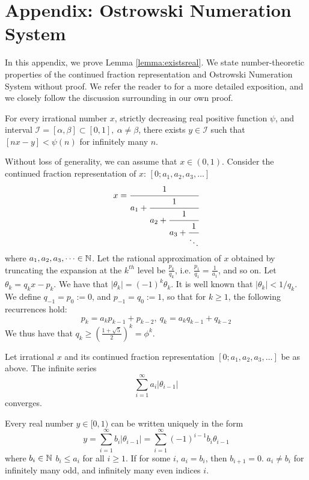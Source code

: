 \section{Appendix: Ostrowski Numeration System}
\label{appendix:ostrowski}

In this appendix, we prove Lemma \ref{lemma:existsreal}. We state number-theoretic properties of the continued fraction representation and Ostrowski Numeration System without proof. We refer the reader to \cite{bourla2016ostrowski} for a more detailed exposition, and we closely follow the discussion surrounding \cite[Propositions 1.1, 2.1]{berthe2022dynamics} in our own proof. 

\begin{lemma}
\label{lemma:existsreal2}
For every irrational number $x$, strictly decreasing real positive function $\psi$, and interval $\mathcal{I} = [\alpha, \beta] \subset [0, 1], ~ \alpha \ne \beta$, there exists $y \in \mathcal{I}$ such that $[nx - y] < \psi(n)$ for infinitely many $n$.
\end{lemma}

Without loss of generality, we can assume that $x \in (0, 1)$. Consider the continued fraction representation of $x$: $[0; a_1, a_2, a_3, \dots]$
$$
x = \cfrac{1}{a_1 + \cfrac{1}{a_2 + \cfrac{1}{a_3 + \cfrac{1}{\ddots}}}}
$$
where $a_1, a_2, a_3, \dots \in \mathbb{N}$. Let the rational approximation of $x$ obtained by truncating the expansion at the $k^{th}$ level be $\frac{p_k}{q_k}$, i.e. $\frac{p_1}{q_1} = \frac{1}{a_1}$, and so on. Let $\theta_k = q_k x -p_k$. We have that $|\theta_k| = (-1)^k\theta_k$. It is well known that $|\theta_k| < 1/q_k$. We define $q_{-1} = p_0 := 0$, and $p_{-1} = q_0 := 1$, so that for $k \ge 1$, the following recurrences hold:
$$
p_k = a_kp_{k-1} + p_{k-2}, ~ q_k = a_kq_{k-1} + q_{k-2}
$$
We thus have that $q_k \ge \left(\frac{1 + \sqrt{5}}{2}\right)^k = \phi^k$.

\begin{proposition}
\label{prop:absconv}
Let irrational $x$ and its continued fraction representation $[0; a_1, a_2, a_3, \dots]$ be as above. The infinite series 
$$
\sum_{i=1}^\infty a_i |\theta_{i-1}|
$$
converges.
\end{proposition}

\begin{proposition}
\label{prop:numsys}
Every real number $y \in [0, 1)$ can be written uniquely in the form
$$
y = \sum_{i=1}^\infty b_i |\theta_{i-1}| = \sum_{i=1}^\infty (-1)^{i-1}b_i \theta_{i-1} 
$$
where $b_i \in \mathbb{N}$ $b_i \le a_i$ for all $i \ge 1$. If for some $i$, $a_i = b_i$, then $b_{i+1} = 0$. $a_i \ne b_i$ for infinitely many odd, and infinitely many even indices $i$.
\end{proposition}

